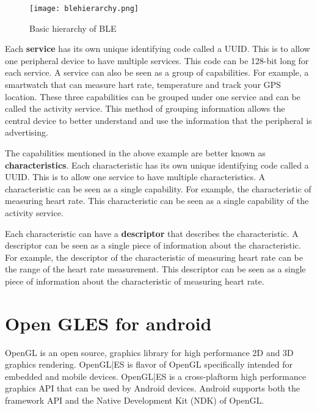 \begin{figure}[!h]
    \centering
    \texttt{[image: blehierarchy.png]}
    \caption{Basic hierarchy of BLE}
    \label{fig:ble_roles}
\end{figure}

Each \textbf{service} has its own unique identifying code called a UUID. This is to allow one peripheral device to have multiple services. This code can be 128-bit long for each service. A service can also be seen as a group of capabilities. For example, a smartwatch that can measure hart rate, temperature and track your GPS location. These three capabilities can be grouped under one service and can be called the activity service. This method of grouping information allows the central device to better understand and use the information that the peripheral is advertising.

The capabilities mentioned in the above example are better known as \textbf{characteristics}. Each characteristic has its own unique identifying code called a UUID. This is to allow one service to have multiple characteristics. A characteristic can be seen as a single capability. For example, the characteristic of measuring heart rate. This characteristic can be seen as a single capability of the activity service. 

Each characteristic can have a \textbf{descriptor} that describes the characteristic. A descriptor can be seen as a single piece of information about the characteristic. For example, the descriptor of the characteristic of measuring heart rate can be the range of the heart rate measurement. This descriptor can be seen as a single piece of information about the characteristic of measuring heart rate.



\section{Open GLES for android}
\label{sec:OpenGL}
OpenGL is an open source, graphics library for high performance 2D and 3D graphics rendering. OpenGL|ES is flavor of OpenGL specifically intended for embedded and mobile devices. OpenGL|ES is a cross-plaftorm high performance graphics API that can be used by Android devices. Android supports both the framework API and the Native Development Kit (NDK) of OpenGL.
